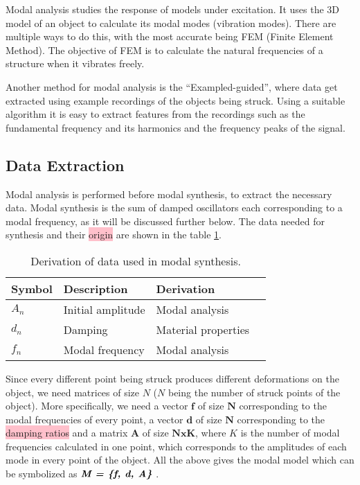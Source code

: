Modal analysis studies the response of models under excitation. It uses the 3D model of an object to calculate its modal modes (vibration modes). There are multiple ways to do this, with the most accurate being FEM (Finite Element Method). The objective of FEM is to calculate the natural frequencies of a structure when it vibrates freely.

Another method for modal analysis is the ``Exampled-guided'', where data get extracted using example recordings of the objects being struck. Using a suitable algorithm it is easy to extract features from the recordings such as the fundamental frequency and its harmonics and the frequency peaks of the signal.

\subsection{Data Extraction}\label{sec:data_extract}
Modal analysis is performed before modal synthesis, to extract the necessary data. Modal synthesis is the sum of damped oscillators each corresponding to a modal frequency, as it will be discussed further below. The data needed for synthesis and their \colorbox{pink}{origin} are shown in the table \ref{tab:extracted_data}.

\begin{table}[H]
	\centering
    \begin{tabular}{ | l | l | l | p{5cm} |}
    \hline
    \textbf{Symbol} & \textbf{Description} & \textbf{Derivation} \\ \hline
    $A_n$ & Initial amplitude & Modal analysis \\ \hline
    $d_n$ & Damping & Material properties \\ \hline
    $f_n$ & Modal frequency & Modal analysis \\
    \hline
    \end{tabular}
    \caption{Derivation of data used in modal synthesis.}
    \label{tab:extracted_data}
\end{table} 

Since every different point being struck produces different deformations on the object, we need matrices of size $N$ ($N$ being the number of struck points of the object). More specifically, we need a vector $\textbf{f}$ of size $\textbf{N}$ corresponding to the modal frequencies of every point, a vector $\textbf{d}$ of size $\textbf{N}$ corresponding to the \colorbox{pink}{damping ratios} and a matrix $\textbf{A}$ of size $\textbf{NxK}$, where $K$ is the number of modal frequencies calculated in one point, which corresponds to the amplitudes of each mode in every point of the object. All the above gives the modal model which can be symbolized as $\textbf{\textit{M = \{f, d, A\}}}$ \cite{van2001foleyautomatic}.
 

